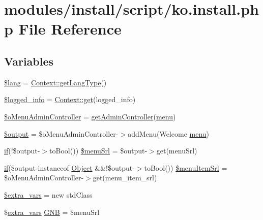 \hypertarget{ko_8install_8php}{}\section{modules/install/script/ko.install.\+php File Reference}
\label{ko_8install_8php}
\subsection*{Variables}
\begin{DoxyCompactItemize}
\item 
\hyperlink{ko_8install_8php_a7714b111b644017933931ec69a154102}{\$lang} = \hyperlink{classContext_ae75d6f4064d09e48d0d76614b6997e29}{Context\+::get\+Lang\+Type}()
\item 
\hyperlink{ko_8install_8php_a193c1593ceb216e9fb05b0bad01ebbc8}{\$logged\+\_\+info} = \hyperlink{classContext_a90ce25d65fe6c9778421cbb36ab3def5}{Context\+::get}(\textquotesingle{}logged\+\_\+info\textquotesingle{})
\item 
\hyperlink{ko_8install_8php_a9062530c3b03479ca4530daee1c18887}{\$o\+Menu\+Admin\+Controller} = \hyperlink{func_8inc_8php_a2f7ca88a5226536aca3b2f5682bd7b2d}{get\+Admin\+Controller}(\textquotesingle{}\hyperlink{classmenu}{menu}\textquotesingle{})
\item 
\hyperlink{ko_8install_8php_a73004ce9cd673c1bfafd1dc351134797}{\$output} = \$o\+Menu\+Admin\+Controller-\/$>$add\+Menu(\textquotesingle{}Welcome \hyperlink{classmenu}{menu}\textquotesingle{})
\item 
\hyperlink{point__level__icon_8addon_8php_a29031816e50a8f742422e671b2bef9b2}{if}(!\$output-\/$>$to\+Bool()) \hyperlink{ko_8install_8php_abb9a711d32f19d7aff02c8501ad6fb55}{\$menu\+Srl} = \$output-\/$>$get(\textquotesingle{}menu\+Srl\textquotesingle{})
\item 
\hyperlink{point__level__icon_8addon_8php_a29031816e50a8f742422e671b2bef9b2}{if}(\$output instanceof \hyperlink{classObject}{Object} \&\&!\$output-\/$>$to\+Bool()) \hyperlink{ko_8install_8php_a874928b6d7b44487718f1ede4a9f6ffe}{\$menu\+Item\+Srl} = \$o\+Menu\+Admin\+Controller-\/$>$get(\textquotesingle{}menu\+\_\+item\+\_\+srl\textquotesingle{})
\item 
\hyperlink{ko_8install_8php_ae9f3d13d48d464400201d7ec024d3a45}{\$extra\+\_\+vars} = new std\+Class
\item 
\$\hyperlink{ko_8install_8php_ae1dcb37fc34a8f312d2e6abd6f806743}{extra\+\_\+vars} \hyperlink{ko_8install_8php_a9b1716b68fc04f3492448f38148dcbf5}{G\+N\+B} = \$menu\+Srl

\end{DoxyCompactItemize}
